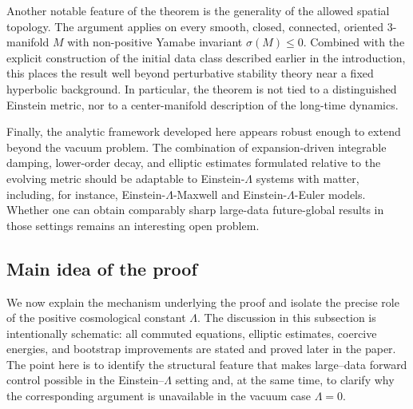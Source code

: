 \documentclass{amsart}
\begin{document}
\medskip

\noindent Another notable feature of the theorem is the generality of the allowed spatial topology.  The argument applies on every smooth, closed, connected, oriented \(3\)-manifold \(M\) with non-positive Yamabe invariant \(\sigma(M)\le 0\).  Combined with the explicit construction of the initial data class described earlier in the introduction, this places the result well beyond perturbative stability theory near a fixed hyperbolic background.  In particular, the theorem is not tied to a distinguished Einstein metric, nor to a center-manifold description of the long-time dynamics.

\medskip

\noindent Finally, the analytic framework developed here appears robust enough to extend beyond the vacuum problem.  The combination of expansion-driven integrable damping, lower-order decay, and elliptic estimates formulated relative to the evolving metric should be adaptable to Einstein-\(\Lambda\) systems with matter, including, for instance, Einstein-\(\Lambda\)-Maxwell and Einstein-\(\Lambda\)-Euler models.  Whether one can obtain comparably sharp large-data future-global results in those settings remains an interesting open problem.

\subsection{Main idea of the proof}
\label{mainidea}

We now explain the mechanism underlying the proof and isolate the precise role of the positive cosmological constant $\Lambda$.  The discussion in this subsection is intentionally schematic: all commuted equations, elliptic estimates, coercive energies, and bootstrap improvements are stated and proved later in the paper.  The point here is to identify the structural feature that makes large--data forward control possible in the Einstein--\(\Lambda\) setting and, at the same time, to clarify why the corresponding argument is unavailable in the vacuum case \(\Lambda=0\).

\medskip
\end{document}
